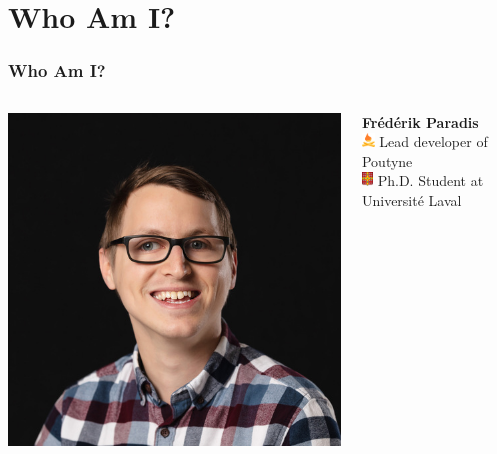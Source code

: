 \documentclass[english,usenames,dvipsnames]{beamer}
\begin{document}
\begin{frame}[nonum]
	\tableofcontents[subsubsectionstyle=hide/hide]
\end{frame}

\section{Who Am I?}

\begin{frame}
	\frametitle{Who Am I?}

	\begin{center}
		\begin{columns}
			\begin{column}{0.4\textwidth}
				\centering
				\includegraphics[width=\textwidth]{baseline-frederik-paradis.jpg}
			\end{column}
			\begin{column}{0.6\textwidth}
				\textbf{Frédérik Paradis}\\
				\vspace{1em}
				\includegraphics[height=1em]{logo-notext.pdf} Lead developer of Poutyne\\
				\vspace{0.5em}
				\includegraphics[height=1em]{ul-notext.pdf} Ph.D. Student at Université Laval\\

\end{column}
\end{columns}
\end{center}
\end{frame}
\end{document}
